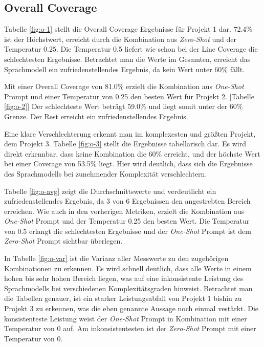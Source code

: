 \subsection{Overall Coverage}
Tabelle \ref{fig:o-1} stellt die Overall Coverage Ergebnisse für Projekt 1 dar. 72.4\% ist der Höchstwert, erreicht durch die Kombination aus \textit{Zero-Shot} und der Temperatur 0.25. Die Temperatur 0.5 liefert wie schon bei der Line Coverage die schlechtesten Ergebnisse. Betrachtet man die Werte im Gesamten, erreicht das Sprachmodell ein zufriedenstellendes Ergebnis, da kein Wert unter 60\% fällt.

Mit einer Overall Coverage von 81.0\% erzielt die Kombination aus \textit{One-Shot} Prompt und einer Temperatur von 0.25 den besten Wert für Projekt 2. [Tabelle \ref{fig:o-2}] Der schlechteste Wert beträgt 59.0\% und liegt somit unter der 60\% Grenze. Der Rest erreicht ein zufriedenstellendes Ergebnis.

Eine klare Verschlechterung erkennt man im komplexesten und größten Projekt, dem Projekt 3. Tabelle \ref{fig:o-3} stellt die Ergebnisse tabellarisch dar. Es wird direkt erkennbar, dass keine Kombination die 60\% erreicht, und der höchste Wert bei einer Coverage von 53.5\% liegt. Hier wird deutlich, dass sich die Ergebnisse des Sprachmodells bei zunehmender Komplexität verschlechtern.

Tabelle \ref{fig:o-avg} zeigt die Durchschnittswerte und verdeutlicht ein zufriedenstellendes Ergebnis, da 3 von 6 Ergebnissen den angestrebten Bereich erreichen. Wie auch in den vorherigen Metriken, erzielt die Kombination aus \textit{One-Shot} Prompt und der Temperatur 0.25 den besten Wert. Die Temperatur von 0.5 erlangt die schlechtesten Ergebnisse und der \textit{One-Shot} Prompt ist dem \textit{Zero-Shot} Prompt sichtbar überlegen.

In Tabelle \ref{fig:o-var} ist die Varianz aller Messwerte zu den zugehörigen Kombinationen zu erkennen. Es wird schnell deutlich, dass alle Werte in einem hohen bis sehr hohen Bereich liegen, was auf eine inkonsistente Leistung des Sprachmodells bei verschiedenen Komplexitätsgraden hinweist. Betrachtet man die Tabellen genauer, ist ein starker Leistungsabfall von Projekt 1 bishin zu Projekt 3 zu erkennen, was die eben genannte Aussage noch einmal vestärkt. Die konsistenteste Leistung weist der \textit{One-Shot} Prompt in Kombination mit einer Temperatur von 0 auf. Am inkonsistentesten ist der \textit{Zero-Shot} Prompt mit einer Temperatur von 0.


